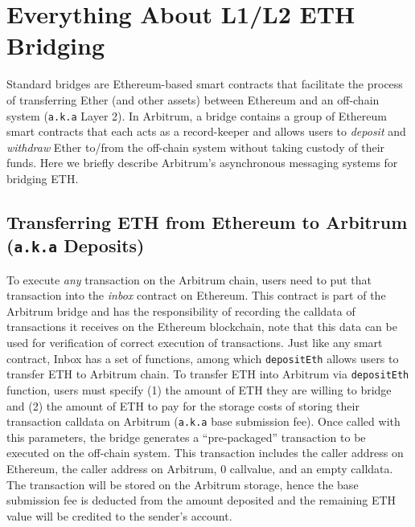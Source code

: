 


\section{Everything About L1/L2 ETH Bridging}\label{sec:bridge}
Standard bridges are Ethereum-based smart contracts that facilitate the process of transferring Ether (and other assets) between Ethereum and an off-chain system (\texttt{a.k.a} Layer 2). In Arbitrum, a bridge contains a group of Ethereum smart contracts that each acts as a record-keeper and allows users to \textit{deposit} and \textit{withdraw} Ether to/from the off-chain system without taking custody of their funds. Here we briefly describe Arbitrum's asynchronous messaging systems for bridging ETH.

\subsection{Transferring ETH from Ethereum to Arbitrum (\texttt{a.k.a} Deposits)}

To execute \textit{any} transaction on the Arbitrum chain, users need to put that transaction into the \textit{inbox} contract on Ethereum. This contract is part of the Arbitrum bridge and has the responsibility of recording the calldata of transactions it receives on the Ethereum blockchain, note that this data can be used for verification of correct execution of transactions. Just like any smart contract, Inbox has a set of functions, among which \texttt{depositEth} allows users to transfer ETH to Arbitrum chain. To transfer ETH into Arbitrum via \texttt{depositEth} function, users must specify (1) the amount of  ETH they are willing to bridge and (2) the amount of ETH to pay for the storage costs of storing their transaction calldata on Arbitrum (\texttt{a.k.a} base submission fee). Once called with this parameters, the bridge generates a “pre-packaged” transaction to be executed on the off-chain system. This transaction includes the caller address on Ethereum, the caller address on Arbitrum, 0 callvalue, and an empty calldata. The transaction will be stored on the Arbitrum storage, hence the base submission fee is deducted from the amount deposited and the remaining ETH value will be credited to the sender’s account.



